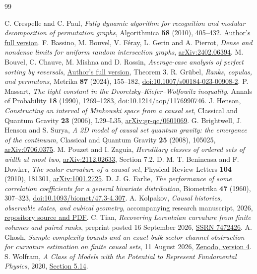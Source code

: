 \documentclass[11pt]{article}
\theoremstyle{remark}
\numberwithin{equation}{section}
\begin{document}
\begin{thebibliography}{99}
\raggedright
{}
C. Crespelle and C. Paul,
\emph{Fully dynamic algorithm for recognition and modular decomposition
of permutation graphs}, Algorithmica \textbf{58} (2010), 405--432.
\href{https://webusers.i3s.unice.fr/~ccrespelle/publications/J02_DynPermu_long.pdf}{Author's full version}.
F. Bassino, M. Bouvel, V. F\'eray, L. Gerin and A. Pierrot,
\emph{Dense and nondense limits for uniform random intersection graphs},
\href{https://arxiv.org/abs/2402.06394}{arXiv:2402.06394}.
M. Bouvel, C. Chauve, M. Mishna and D. Rossin,
\emph{Average-case analysis of perfect sorting by reversals},
\href{https://www.cecm.sfu.ca/~cchauve/Publications/DMAA_CPM09.pdf}{Author's full version}, Theorem 3.
R. Gr\"ubel, \emph{Ranks, copulas, and permutons},
Metrika \textbf{87} (2024), 155--182,
\href{https://doi.org/10.1007/s00184-023-00908-2}{doi:10.1007/s00184-023-00908-2}.
P. Massart, \emph{The tight constant in the Dvoretzky--Kiefer--Wolfowitz
inequality}, Annals of Probability \textbf{18} (1990), 1269--1283,
\href{https://doi.org/10.1214/aop/1176990746}{doi:10.1214/aop/1176990746}.
J. Henson, \emph{Constructing an interval of Minkowski space from a
causal set}, Classical and Quantum Gravity \textbf{23} (2006), L29--L35,
\href{https://arxiv.org/abs/gr-qc/0601069}{arXiv:gr-qc/0601069}.
G. Brightwell, J. Henson and S. Surya,
\emph{A 2D model of causal set quantum gravity: the emergence of the continuum},
Classical and Quantum Gravity \textbf{25} (2008), 105025,
\href{https://arxiv.org/abs/0706.0375}{arXiv:0706.0375}.
M. Pouzet and I. Zaguia,
\emph{Hereditary classes of ordered sets of width at most two},
\href{https://arxiv.org/abs/2112.02633}{arXiv:2112.02633}, Section 7.2.
D. M. T. Benincasa and F. Dowker,
\emph{The scalar curvature of a causal set},
Physical Review Letters \textbf{104} (2010), 181301,
\href{https://arxiv.org/abs/1001.2725}{arXiv:1001.2725}.
D. J. G. Farlie, \emph{The performance of some correlation
coefficients for a general bivariate distribution},
Biometrika \textbf{47} (1960), 307--323,
\href{https://doi.org/10.1093/biomet/47.3-4.307}{doi:10.1093/biomet/47.3-4.307}.
A. Kolpakov, \emph{Causal histories, observable states, and cubical
geometry}, accompanying research manuscript, 2026,
\href{https://github.com/WolframInstitute/graph_of_graphs/tree/main/history-state-paper}{repository source and PDF}.
C. Tian, \emph{Recovering Lorentzian curvature from finite volumes
and paired ranks}, preprint posted 16 September 2026,
\href{https://ssrn.com/abstract=7472426}{SSRN 7472426}.
A. Ghosh, \emph{Sample-complexity bounds and an exact bulk-sector
channel obstruction for curvature estimation on finite causal sets},
11 August 2026,
\href{https://zenodo.org/records/21931074}{Zenodo, version 4}.
S. Wolfram, \emph{A Class of Models with the Potential to Represent
Fundamental Physics}, 2020,
\href{https://www.wolframphysics.org/technical-introduction/the-updating-process-for-string-substitution-systems/foliations-and-coordinates-on-causal-graphs/}{Section 5.14}.
\end{thebibliography}
\end{document}
